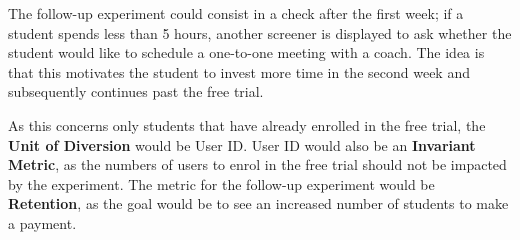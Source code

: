 \documentclass[11pt]{article} %
\begin{document}
The follow-up experiment could consist in a check after the first week; if a student spends less than 5 hours, another screener is displayed to ask whether the student would like to schedule a one-to-one meeting with a coach. The idea is that this motivates the student to invest more time in the second week and subsequently continues past the free trial.\medskip

As this concerns only students that have already enrolled in the free trial, the \textbf{Unit of Diversion} would be User ID. User ID would also be an \textbf{Invariant Metric}, as the numbers of users to enrol in the free trial should not be impacted by the experiment. The metric for the follow-up experiment would be \textbf{Retention}, as the goal would be to see an increased number of students to make a payment.
\end{document}
